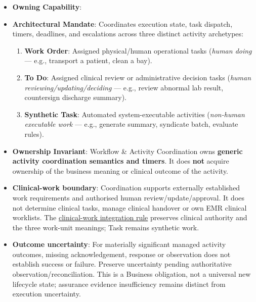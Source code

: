\begin{itemize}

\item
\textbf{Owning Capability}: \texttt{}



\item
\textbf{Architectural Mandate}: Coordinates execution state, task dispatch, timers, deadlines, and escalations across three distinct activity archetypes:


\begin{enumerate}

\item
\textbf{Work Order}: Assigned physical/\allowbreak{}human operational tasks (\emph{human doing} — e.g., transport a patient, clean a bay).



\item
\textbf{To Do}: Assigned clinical review or administrative decision tasks (\emph{human reviewing/\allowbreak{}updating/\allowbreak{}deciding} — e.g., review abnormal lab result, countersign discharge summary).



\item
\textbf{Synthetic Task}: Automated system-executable activities (\emph{non-human executable work} — e.g., generate summary, syndicate batch, evaluate rules).



\end{enumerate}


\item
\textbf{Ownership Invariant}: Workflow \& Activity Coordination owns \textbf{generic activity coordination semantics and timers}. It does \textbf{not} acquire ownership of the business meaning or clinical outcome of the activity.



\item
\textbf{Clinical-work boundary}: Coordination supports externally established work requirements and authorised human review/\allowbreak{}update/\allowbreak{}approval. It does not determine clinical tasks, manage clinical handover or own EMR clinical worklists. The \hyperref[rad:metamodel:173]{clinical-work integration rule} preserves clinical authority and the three work-unit meanings; Task remains synthetic work.



\item
\textbf{Outcome uncertainty}: For materially significant managed activity outcomes, missing acknowledgement, response or observation does not establish success or failure. Preserve uncertainty pending authoritative observation/\allowbreak{}reconciliation. This is a Business obligation, not a universal new lifecycle state; assurance evidence insufficiency remains distinct from execution uncertainty.




\end{itemize}
